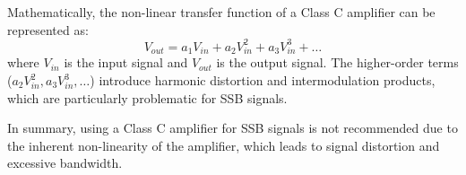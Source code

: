Mathematically, the non-linear transfer function of a Class C amplifier can be represented as:
\[ V_{out} = a_1 V_{in} + a_2 V_{in}^2 + a_3 V_{in}^3 + \dots \]
where \( V_{in} \) is the input signal and \( V_{out} \) is the output signal. The higher-order terms (\( a_2 V_{in}^2, a_3 V_{in}^3, \dots \)) introduce harmonic distortion and intermodulation products, which are particularly problematic for SSB signals.

In summary, using a Class C amplifier for SSB signals is not recommended due to the inherent non-linearity of the amplifier, which leads to signal distortion and excessive bandwidth.


